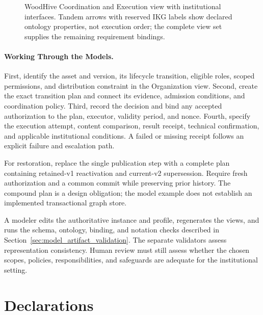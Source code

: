 \documentclass[journal]{IEEEtran}
\begin{document}
\begin{figure}[t]
\caption{WoodHive Coordination and Execution view with institutional interfaces. Tandem arrows with reserved IKG labels show declared ontology properties, not execution order; the complete view set supplies the remaining requirement bindings.}
\label{fig:woodhive_etdm_notation}
\end{figure}

\paragraph{Working Through the Models.}
First, identify the asset and version, its lifecycle transition,
eligible roles, scoped permissions, and distribution constraint
in the Organization view. Second, create the exact transition
plan and connect its evidence, admission conditions, and
coordination policy. Third, record the decision and bind any
accepted authorization to the plan, executor, validity period,
and nonce. Fourth, specify the execution attempt, content
comparison, result receipt, technical confirmation, and
applicable institutional conditions. A failed or missing
receipt follows an explicit failure and escalation path.

For restoration, replace the single publication step with
a complete plan containing retained-v1 reactivation and
current-v2 supersession. Require fresh authorization and a
common commit while preserving prior history. The compound
plan is a design obligation; the model example does not
establish an implemented transactional graph store.

A modeler edits the authoritative instance and profile,
regenerates the views, and runs the schema, ontology, binding,
and notation checks described in
Section~\ref{sec:model_artifact_validation}. The separate
validators assess representation consistency. Human review
must still assess whether the chosen scopes, policies,
responsibilities, and safeguards are adequate for the
institutional setting.

\clearpage
\section*{Declarations}
\end{document}
